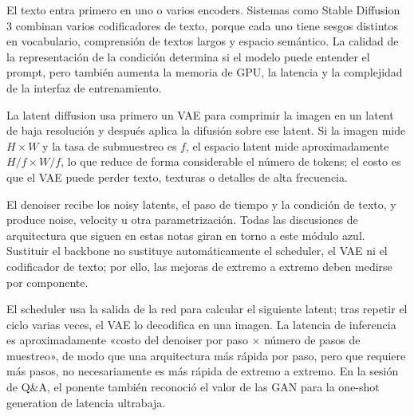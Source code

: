 
El texto entra primero en uno o varios encoders. Sistemas como Stable Diffusion 3 combinan varios codificadores de texto, porque cada uno tiene sesgos distintos en vocabulario, comprensión de textos largos y espacio semántico. La calidad de la representación de la condición determina si el modelo puede entender el prompt, pero también aumenta la memoria de GPU, la latencia y la complejidad de la interfaz de entrenamiento.


La latent diffusion usa primero un VAE para comprimir la imagen en un latent de baja resolución y después aplica la difusión sobre ese latent. Si la imagen mide $H\times W$ y la tasa de submuestreo es $f$, el espacio latent mide aproximadamente $H/f\times W/f$, lo que reduce de forma considerable el número de tokens; el costo es que el VAE puede perder texto, texturas o detalles de alta frecuencia.


El denoiser recibe los noisy latents, el paso de tiempo y la condición de texto, y produce noise, velocity u otra parametrización. Todas las discusiones de arquitectura que siguen en estas notas giran en torno a este módulo azul. Sustituir el backbone no sustituye automáticamente el scheduler, el VAE ni el codificador de texto; por ello, las mejoras de extremo a extremo deben medirse por componente.


El scheduler usa la salida de la red para calcular el siguiente latent; tras repetir el ciclo varias veces, el VAE lo decodifica en una imagen. La latencia de inferencia es aproximadamente «costo del denoiser por paso × número de pasos de muestreo», de modo que una arquitectura más rápida por paso, pero que requiere más pasos, no necesariamente es más rápida de extremo a extremo. En la sesión de Q\&A, el ponente también reconoció el valor de las GAN para la one-shot generation de latencia ultrabaja.

